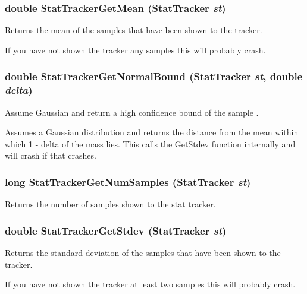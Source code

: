 \subsubsection{\setlength{\rightskip}{0pt plus 5cm}double Stat\-Tracker\-Get\-Mean ({\bf Stat\-Tracker} {\em st})}\label{stats_8h_a5}


Returns the mean of the samples that have been shown to the tracker. 

If you have not shown the tracker any samples this will probably crash. 
\subsubsection{\setlength{\rightskip}{0pt plus 5cm}double Stat\-Tracker\-Get\-Normal\-Bound ({\bf Stat\-Tracker} {\em st}, double {\em delta})}\label{stats_8h_a9}


Assume Gaussian and return a high confidence bound of the sample . 

Assumes a Gaussian distribution and returns the distance from the mean within which 1 - delta  of the mass lies. This calls the Get\-Stdev function internally and will crash if that crashes. 
\subsubsection{\setlength{\rightskip}{0pt plus 5cm}long Stat\-Tracker\-Get\-Num\-Samples ({\bf Stat\-Tracker} {\em st})}\label{stats_8h_a8}


Returns the number of samples shown to the stat tracker. 

\subsubsection{\setlength{\rightskip}{0pt plus 5cm}double Stat\-Tracker\-Get\-Stdev ({\bf Stat\-Tracker} {\em st})}\label{stats_8h_a7}


Returns the standard deviation of the samples that have been shown to the tracker. 

If you have not shown the tracker at least two samples this will probably crash. 
